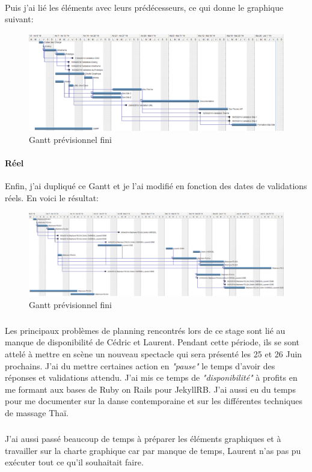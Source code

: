 \documentclass[11pt,a4paper,twoside]{report}
\begin{document}
			\paragraph*{}Puis j'ai lié les éléments avec leurs prédécesseurs, ce qui donne le graphique suivant: 

				\begin{figure}[H]
					\centering
					\includegraphics[width=\textwidth]{Gantt_Previsionnel_2.eps}
					\caption{Gantt prévisionnel fini}
					\label{fig:Graphique Gantt Previsionnel}
				\end{figure}
			\paragraph*{Réel}Enfin, j'ai dupliqué ce Gantt et je l'ai modifié en fonction des dates de validations réels. En voici le résultat: 

				\begin{figure}[H]
					\centering
					\includegraphics[width=\textwidth]{Gantt_Reel_2.eps}
					\caption{Gantt prévisionnel fini}
					\label{fig:Gantt Reel}
				\end{figure}
				\subparagraph*{}Les principaux problèmes de planning rencontrés lors de ce stage sont lié au manque de disponibilité de Cédric et Laurent. Pendant cette période, ils se sont attelé à mettre en scène un nouveau spectacle qui sera présenté les 25 et 26 Juin prochains. J'ai du mettre certaines action en \textit{"pause"} le temps d'avoir des réponses et validations attendu. J'ai mis ce temps de \textit{"disponibilité"} à profits en me formant aux bases de Ruby on Rails pour JekyllRB. J'ai aussi eu du temps pour me documenter sur la danse contemporaine et sur les différentes techniques de massage Thaï.
				\subparagraph*{}J'ai aussi passé beaucoup de temps à préparer les éléments graphiques et à travailler sur la charte graphique car par manque de temps, Laurent n'as pas pu exécuter tout ce qu'il souhaitait faire.
				\newpage
\end{document}
